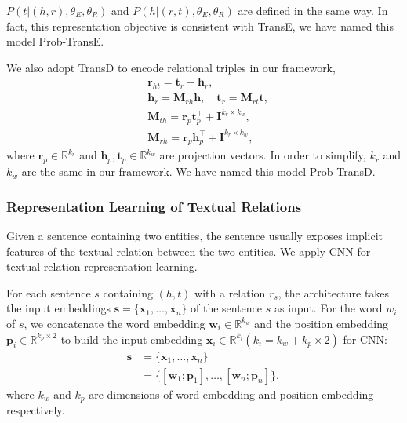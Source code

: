 \documentclass[letterpaper]{article} %
\begin{document}
$P(t|(h, r), {\theta_E, \theta_R})$ and $P(h|(r, t),{\theta_E, \theta_R})$ are defined in the same way. In fact, this representation objective is consistent with TransE, we have named this model Prob-TransE.

We also adopt TransD to encode relational triples in our framework, 
\begin{align}
&\textbf{r}_{ht} = \textbf{t}_{r} - \textbf{h}_{r}, \\
&\textbf{h}_{r}  = \textbf{M}_{rh}\textbf{h}, \quad \textbf{t}_{r} = \textbf{M}_{rt}\textbf{t}, \\\nonumber
&\textbf{M}_{th} = \textbf{r}_p\textbf{t}_p^{\top}+\textbf{I}^{k_r \times k_w},	\\\nonumber
&\textbf{M}_{rh} = \textbf{r}_p\textbf{h}_p^{\top}+\textbf{I}^{k_r \times k_w},	\nonumber
\end{align}
where $\textbf{r}_p \in \mathbb{R}^{k_r} $ and $\textbf{h}_p, \textbf{t}_p \in \mathbb{R}^{k_w}$ are projection vectors. In order to simplify, $k_r$ and $k_w$ are the same in our framework. We have named this model Prob-TransD.


\subsubsection{Representation Learning of Textual Relations}
\label{sec:relation} 

Given a sentence containing two entities, the sentence usually exposes implicit features of the textual relation between the two entities. We apply CNN for textual relation representation learning.

For each sentence $s$ containing $(h, t)$ with a relation $r_s$, the architecture takes the input embeddings $\mathbf{s} = \{\mathbf{x}_1, \ldots, \mathbf{x}_n \}$ of the sentence $s$ as input. For the word $w_i$ of $s$, we concatenate the word embedding $\mathbf{w}_i \in \mathbb{R}^{k_w} $ \cite{mikolov2013efficient} and the position embedding $\mathbf{p}_i \in \mathbb{R}^{k_p \times 2} $ \cite{zeng2014relation} to build the input embedding $\mathbf{x}_i \in \mathbb{R}^{k_i} (k_i = k_w + k_p \times 2)$ for CNN:
\begin{align}
\mathbf{s} & = \{\mathbf{x}_1,\ldots, \mathbf{x}_n\} \\\nonumber
&=\{[\mathbf{w}_1;\mathbf{p}_1],\ldots, [\mathbf{w}_n;\mathbf{p}_n]\},
\end{align}
where $k_w$ and $k_p$ are dimensions of word embedding and position embedding respectively.
\end{document}
